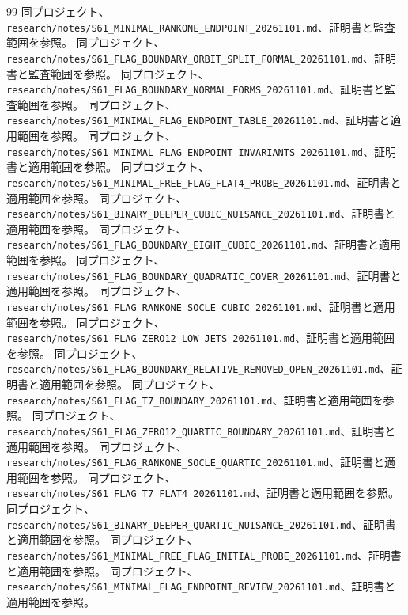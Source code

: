 \documentclass[11pt,a4paper]{ltjsarticle}
\theoremstyle{remark}
\begin{document}
\begin{thebibliography}{99}
 同プロジェクト、\nolinkurl{research/notes/S61_MINIMAL_RANKONE_ENDPOINT_20261101.md}、証明書と監査範囲を参照。
 同プロジェクト、\nolinkurl{research/notes/S61_FLAG_BOUNDARY_ORBIT_SPLIT_FORMAL_20261101.md}、証明書と監査範囲を参照。
 同プロジェクト、\nolinkurl{research/notes/S61_FLAG_BOUNDARY_NORMAL_FORMS_20261101.md}、証明書と監査範囲を参照。
 同プロジェクト、\nolinkurl{research/notes/S61_MINIMAL_FLAG_ENDPOINT_TABLE_20261101.md}、証明書と適用範囲を参照。
 同プロジェクト、\nolinkurl{research/notes/S61_MINIMAL_FLAG_ENDPOINT_INVARIANTS_20261101.md}、証明書と適用範囲を参照。
 同プロジェクト、\nolinkurl{research/notes/S61_MINIMAL_FREE_FLAG_FLAT4_PROBE_20261101.md}、証明書と適用範囲を参照。
 同プロジェクト、\nolinkurl{research/notes/S61_BINARY_DEEPER_CUBIC_NUISANCE_20261101.md}、証明書と適用範囲を参照。
 同プロジェクト、\nolinkurl{research/notes/S61_FLAG_BOUNDARY_EIGHT_CUBIC_20261101.md}、証明書と適用範囲を参照。
 同プロジェクト、\nolinkurl{research/notes/S61_FLAG_BOUNDARY_QUADRATIC_COVER_20261101.md}、証明書と適用範囲を参照。
 同プロジェクト、\nolinkurl{research/notes/S61_FLAG_RANKONE_SOCLE_CUBIC_20261101.md}、証明書と適用範囲を参照。
 同プロジェクト、\nolinkurl{research/notes/S61_FLAG_ZERO12_LOW_JETS_20261101.md}、証明書と適用範囲を参照。
 同プロジェクト、\nolinkurl{research/notes/S61_FLAG_BOUNDARY_RELATIVE_REMOVED_OPEN_20261101.md}、証明書と適用範囲を参照。
 同プロジェクト、\nolinkurl{research/notes/S61_FLAG_T7_BOUNDARY_20261101.md}、証明書と適用範囲を参照。
 同プロジェクト、\nolinkurl{research/notes/S61_FLAG_ZERO12_QUARTIC_BOUNDARY_20261101.md}、証明書と適用範囲を参照。
 同プロジェクト、\nolinkurl{research/notes/S61_FLAG_RANKONE_SOCLE_QUARTIC_20261101.md}、証明書と適用範囲を参照。
 同プロジェクト、\nolinkurl{research/notes/S61_FLAG_T7_FLAT4_20261101.md}、証明書と適用範囲を参照。
 同プロジェクト、\nolinkurl{research/notes/S61_BINARY_DEEPER_QUARTIC_NUISANCE_20261101.md}、証明書と適用範囲を参照。
 同プロジェクト、\nolinkurl{research/notes/S61_MINIMAL_FREE_FLAG_INITIAL_PROBE_20261101.md}、証明書と適用範囲を参照。
 同プロジェクト、\nolinkurl{research/notes/S61_MINIMAL_FLAG_ENDPOINT_REVIEW_20261101.md}、証明書と適用範囲を参照。

\end{thebibliography}
\end{document}
